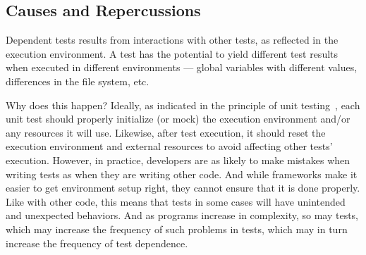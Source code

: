 \subsection{Causes and Repercussions}
\label{sec:intro-repercussions}


Dependent tests results from interactions with other tests,
as reflected in the execution environment.
A test has the potential to yield
different test results when executed in different environments
--- global variables with different values, differences in the file system, etc.

Why does this happen? Ideally, as
indicated in the principle of unit testing~\cite{Massol:2003}, each unit
test should properly initialize (or mock) the execution environment
and/or any resources it will use.
Likewise, after test execution, it should reset the
execution environment and external resources
to avoid affecting other tests' execution.
However, in practice,
developers are as likely
to make mistakes when writing tests as when they are writing other code.
And while frameworks make it easier to get
environment setup right, they cannot ensure that it is done
properly. Like with other code, this means that tests in some
cases will have unintended and unexpected behaviors. And
as programs increase in complexity, so may tests, which may
increase the frequency of such problems in tests, which may
in turn increase the frequency of test dependence.



%
%





